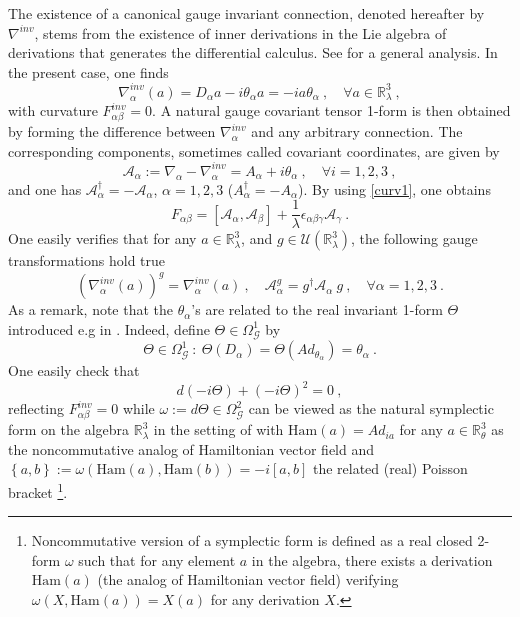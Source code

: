 \documentclass[a4paper,11pt,twoside]{article}
\numberwithin{equation}{section}
\newcommand\ham{{\text{Ham}}}
\theoremstyle{nonumberplain}
\newcounter{and}
\begin{document}
%
The existence of a canonical gauge invariant connection, denoted hereafter by $\nabla^{inv}$, stems from the existence of inner derivations in the Lie algebra of derivations that generates the differential calculus. See \cite{mdv88-99} for a general analysis. In the present case, one finds
%
\begin{equation} 
\nabla^{inv}_\alpha(a) = D_\alpha a - i \theta_\alpha a = - i a \theta_\alpha \ , \quad \forall a \in \mathbb{R}^3_\lambda \ , \label{invar-connect}
\end{equation}
%
with curvature $F^{inv}_{\alpha\beta}=0$. A natural gauge covariant tensor 1-form is then obtained by forming the difference between $\nabla^{inv}_\alpha$ and any arbitrary connection. The corresponding components, sometimes called covariant coordinates, are given by%
%
\begin{equation}
\mathcal{A}_\alpha := \nabla_\alpha - \nabla^{inv}_\alpha = A_\alpha + i \theta_\alpha \ , \quad \forall i=1,2,3 \ , \label{tens-form}
\end{equation}
%
and one has $\mathcal{A}_\alpha^\dag = - \mathcal{A}_\alpha$, $\alpha=1,2,3$ ($A_\alpha^\dag=-A_\alpha$). By using \eqref{curv1}, one obtains%
%
\begin{equation} 
F_{\alpha\beta} = \left[\mathcal{A}_\alpha,\mathcal{A}_\beta\right] + \frac{1}{\lambda} \epsilon_{\alpha\beta\gamma} \mathcal{A}_\gamma \ . \label{curv2}
\end{equation}
%
One easily verifies that for any $a\in\mathbb{R}^3_\lambda$, and $g\in\mathcal{U}(\mathbb{R}^3_\lambda)$, the following gauge transformations hold true%
%
\begin{equation}
(\nabla^{inv}_\alpha(a))^g = \nabla^{inv}_\alpha(a) \ , \quad \mathcal{A}^g_\alpha = g^\dag \mathcal{A}_\alpha \ g \ , \quad \forall \alpha=1,2,3 \ . \label{conection-invariace}
\end{equation}
%
As a remark, note that the $\theta_\alpha$'s are related to the real invariant 1-form $\Theta$ introduced e.g in \cite{mdv88-99}. Indeed, define $\Theta\in\Omega^1_\mathcal{G}$ by%
%
\begin{equation*}
\Theta \in \Omega^1_\mathcal{G} \ : \ \Theta(D_\alpha) = \Theta(Ad_{\theta_\alpha}) = \theta_\alpha \ .
\end{equation*}
%
One easily check that%
%
\begin{equation*}
d(-i\Theta)+(-i\Theta)^2=0 \ ,
\end{equation*}
%
reflecting $F^{inv}_{\alpha\beta}=0$ while $\omega:=d\Theta\in\Omega^2_\mathcal{G}$ can be viewed as the natural symplectic form on the algebra $\mathbb{R}^3_\lambda$ in the setting of \cite{mdv88-99} with $\ham(a)=Ad_{ia}$ for any $a\in\mathbb{R}^3_\theta$ as the noncommutative analog of Hamiltonian vector field and $\left\{a,b\right\}:=\omega\left(\ham(a),\ham(b)\right)=-i\left[a,b\right]$ the related (real) Poisson bracket {\footnote{Noncommutative version of a symplectic form is defined as a real closed 2-form $\omega$ such that for any element $a$ in the algebra, there exists a derivation $\ham(a)$ (the analog of Hamiltonian vector field) verifying $\omega(X,\ham(a))=X(a)$ for any derivation $X$.}}.\par
\end{document}
